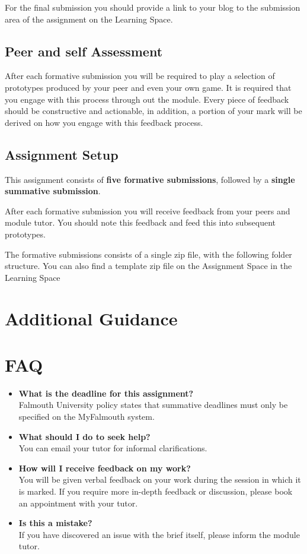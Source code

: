 \documentclass{../../fal_assignment}
\begin{document}
For the final submission you should provide a link to your blog to the submission area of the assignment on the Learning Space.

\subsection*{Peer and self Assessment}
After each formative submission you will be required to play a selection of prototypes produced by your peer and even your own game. It is required that you engage with
this process through out the module. Every piece of feedback should be constructive and actionable, in addition, a portion of your mark will be derived on how you engage with this
feedback process. 

\subsection*{Assignment Setup} 

This assignment consists of \textbf{five formative submissions}, followed by a \textbf{single summative submission}.

After each formative submission you will receive feedback from your peers and module tutor. You should note this feedback and feed this into subsequent prototypes.  

The formative submissions consists of a single zip file, with the following folder structure. You can also find a template zip file on the Assignment Space in the Learning Space


\section*{Additional Guidance}



\section*{FAQ}

\begin{itemize}
	\item 	\textbf{What is the deadline for this assignment?} \\ 
    		Falmouth University policy states that summative deadlines must only be specified on the MyFalmouth system.
    		
	\item 	\textbf{What should I do to seek help?} \\ 
    		You can email your tutor for informal clarifications.  
    		
	\item 	\textbf{How will I receive feedback on my work?} \\ 
    		You will be given verbal feedback on your work during the session in which it is marked.
    		If you require more in-depth feedback or discussion, please book an appointment with your tutor.
    		
    	\item 	\textbf{Is this a mistake?} \\ 	
    		If you have discovered an issue with the brief itself, please inform the module tutor.
\end{itemize}
\end{document}
